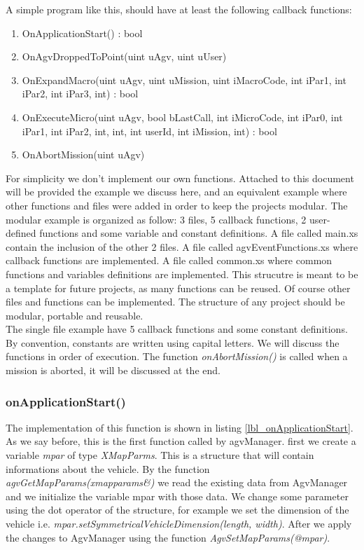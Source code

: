 A simple program like this, should have at least the following callback functions:
\begin{enumerate}  
	\item OnApplicationStart() : bool 
	\item OnAgvDroppedToPoint(uint uAgv, uint uUser) 
	\item OnExpandMacro(uint uAgv, uint uMission, uint iMacroCode, int iPar1, int iPar2, int iPar3, int) : bool
	\item OnExecuteMicro(uint uAgv, bool bLastCall, int iMicroCode, int iPar0, int iPar1, int iPar2, int, int, int userId, int iMission, int) : bool
	\item OnAbortMission(uint uAgv)\\
\end{enumerate}

For simplicity we don't implement our own functions. Attached to this document will be provided the example we discuss here, and an equivalent example where other functions and files were added in order to keep the projects modular.
The modular example is organized as follow: 3 files, 5 callback functions, 2 user-defined functions and some variable and constant definitions.
A file called main.xs contain the inclusion of the other 2 files. A file called agvEventFunctions.xs where callback functions are implemented.
A file called common.xs where common functions and variables definitions are implemented. This strucutre is meant to be a template for future projects, as many functions can be reused. Of course other files and functions can be implemented. The structure of any project should be modular, portable and reusable.\\

The single file example have 5 callback functions and some constant definitions. By convention, constants are written using capital letters.
We will discuss the functions in order of execution. The function \textit{onAbortMission()} is called when a mission is aborted, it will be discussed at the end.

\subsubsection{onApplicationStart()}
The implementation of this function is shown in listing \ref{lbl_onApplicationStart}. As we say before, this is the first function called by agvManager.
first we create a variable \textit{mpar} of type \textit{XMapParms}. This is a structure that will contain informations about the vehicle.
By the function \textit{agvGetMapParams(xmapparams\&)} we read the existing data from AgvManager and we initialize the variable mpar with those data.
We change some parameter using the dot operator of the structure, for example we set the dimension of the vehicle i.e. \textit{mpar.setSymmetricalVehicleDimension(length, width)}. After we apply the changes to AgvManager using the function \textit{AgvSetMapParams(@mpar)}.

